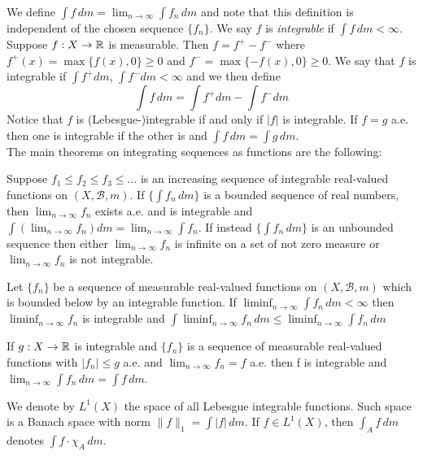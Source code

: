 We define $\int f \, dm = \lim_{n \rightarrow \infty} \int f_n \, dm$ and note that this definition is independent of the chosen sequence $\{ f_n \}$. We say $f$ is \textit{integrable} if $\int f \, dm < \infty$. 
\\Suppose $f:X \rightarrow \mathbb{R}$ is measurable. Then $f = f^+ - f^-$ where $f^+(x) = \max \{f(x), 0 \} \geq 0$ and $f^- = \max \{ -f(x), 0 \} \geq 0$. We say that $f$ is integrable if $\int f^+ dm$, $\int f^- dm < \infty$ and we then define 
\begin{equation*}
    \int f \, dm = \int f^+ dm - \int f^- dm
\end{equation*}
Notice that $f$ is (Lebesgue-)integrable if and only if $|f|$ is integrable. If $f=g$ a.e. then one is integrable if the other is and $\int f \, dm = \int g \, dm$. 
\\The main theorems on integrating sequences as functions are the following: 
\begin{theorem}
Suppose $f_1 \leq f_2 \leq f_3 \leq \dots$ is an increasing sequence of integrable real-valued functions on $(X, \mathscr{B}, m)$. If $\big\{ \int f_n \, dm \big\}$ is a bounded sequence of real numbers, then $\lim_{n \rightarrow \infty} f_n$ exists a.e. and is integrable and $\int (\lim_{n \rightarrow \infty} f_n) dm = \lim_{n \rightarrow \infty} \int f_n$. If instead $\big\{ \int f_n \, dm \big\}$ is an unbounded sequence then either $\lim_{n \rightarrow \infty} f_n$ is infinite on a set of not zero measure or $\lim_{n \rightarrow \infty} f_n$ is not integrable. 
\end{theorem}
\begin{lemma}
Let $\{ f_n \}$ be a sequence of measurable real-valued functions on $(X, \mathscr{B}, m)$ which is bounded below by an integrable function. If $\liminf_{n\rightarrow\infty} \int f_n \, dm < \infty$ then $\liminf_{n\rightarrow\infty} f_n$ is integrable and $\int 
 \liminf_{n\rightarrow\infty} f_n \, dm \leq \liminf_{n\rightarrow\infty} \int f_n \, dm$
 \end{lemma}
 
\begin{corollary}
 If $g:X \rightarrow \mathbb{R}$ is integrable and $\{ f_n \}$ is a sequence of measurable real-valued functions with $|f_n| \leq g$ a.e. and $\lim_{n\rightarrow\infty} f_n = f$ a.e. then f is integrable and $\lim_{n\rightarrow\infty} \int f_n \, dm = \int f \, dm$. 
 \end{corollary}
We denote by $L^1(X)$ the space of all Lebesgue integrable functions. Such space is a Banach space with norm $\|f\|_1 = \int |f| \, dm$. If $f \in L^1(X)$, then $\int_A f \, dm$ denotes $\int f \cdot \chi_A \, dm$. 

